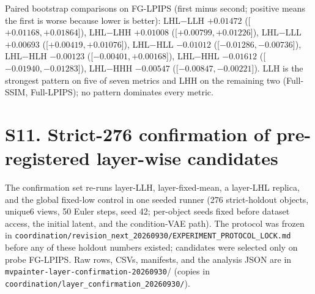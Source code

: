 \documentclass[10pt]{article}
\begin{document}
\begin{table}[h]
\centering\scriptsize
\caption{Complete binary layer-wise factorial; means over 72 object--seed
pairs. Lower is better for LPIPS.}
\end{table}

Paired bootstrap comparisons on FG-LPIPS (first minus second; positive means
the first is worse because lower is better): LHL$-$LLH $+0.01472$
([$+0.01168,+0.01864$]), LHL$-$LHH $+0.01008$ ([$+0.00799,+0.01226$]),
LHL$-$LLL $+0.00693$ ([$+0.00419,+0.01076$]), LHL$-$HLL $-0.01012$
([$-0.01286,-0.00736$]), LHL$-$HLH $-0.00123$ ([$-0.00401,+0.00168$]),
LHL$-$HHL $-0.01612$ ([$-0.01940,-0.01283$]), LHL$-$HHH $-0.00547$
([$-0.00847,-0.00221$]). LLH is the strongest pattern on five of seven
metrics and LHH on the remaining two (Full-SSIM, Full-LPIPS); no pattern
dominates every metric.

\section{S11. Strict-276 confirmation of pre-registered layer-wise candidates}

The confirmation set re-runs layer-LLH, layer-fixed-mean, a layer-LHL
replica, and the global fixed-low control in one seeded runner (276
strict-holdout objects, unique6 views, 50 Euler steps, seed 42; per-object
seeds fixed before dataset access, the initial latent, and the condition-VAE
path). The protocol was frozen in
\texttt{coordination/revision\_next\_20260930/EXPERIMENT\_PROTOCOL\_LOCK.md}
before any of these holdout numbers existed; candidates were selected only on
probe FG-LPIPS. Raw rows, CSVs, manifests, and the analysis JSON are in
\texttt{mvpainter-layer-confirmation-20260930}/ (copies in
\texttt{coordination/layer\_confirmation\_20260930/}).
\end{document}
